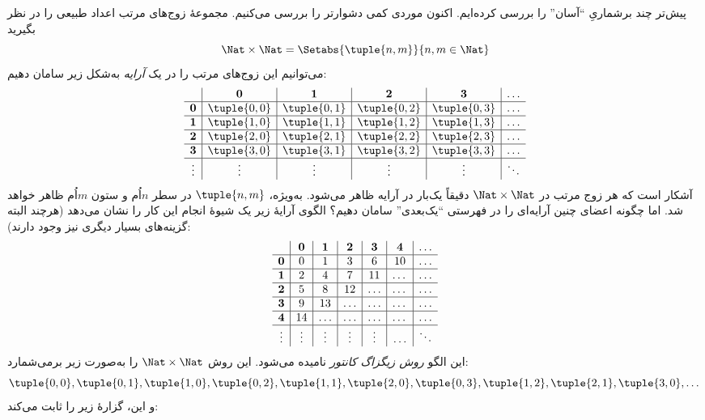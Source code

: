 \documentclass[../../../include/open-logic-section]{subfiles}
\begin{document}


\begin{explain}
پیش‌تر چند برشماریِ ``آسان'' را بررسی کرده‌ایم. اکنون موردی کمی
دشوارتر را بررسی می‌کنیم. مجموعهٔ زوج‌های مرتب اعداد طبیعی را در نظر
بگیرید
\[
\Nat \times \Nat = \Setabs{\tuple{n,m}}{n,m \in \Nat}
\]
می‌توانیم این زوج‌های مرتب را در یک \emph{آرایه} به‌شکل زیر سامان دهیم:
\[
\begin{array}{ c | c | c | c | c | c}
& \mathbf 0 & \mathbf 1 & \mathbf 2 & \mathbf 3 & \dots \\
\hline
\mathbf 0 & \tuple{0,0} & \tuple{0,1} & \tuple{0,2} & \tuple{0,3} & \dots \\
\hline
\mathbf 1 & \tuple{1,0} & \tuple{1,1} & \tuple{1,2} & \tuple{1,3} & \dots \\
\hline
\mathbf 2 & \tuple{2,0} & \tuple{2,1} & \tuple{2,2} & \tuple{2,3} & \dots \\
\hline
\mathbf 3 & \tuple{3,0} & \tuple{3,1} & \tuple{3,2} & \tuple{3,3} & \dots \\
\hline
\vdots & \vdots & \vdots & \vdots & \vdots & \ddots\\
\end{array}
\]
آشکار است که هر زوج مرتب در $\Nat \times \Nat$ دقیقاً یک‌بار در آرایه
ظاهر می‌شود. به‌ویژه، $\tuple{n,m}$ در سطر $n$اُم و ستون $m$اُم ظاهر
خواهد شد. اما چگونه اعضای چنین آرایه‌ای را در فهرستی ``یک‌بعدی'' سامان
دهیم؟ الگوی آرایهٔ زیر یک شیوهٔ انجام این کار را نشان می‌دهد (هرچند
البته گزینه‌های بسیار دیگری نیز وجود دارند):
\[
\begin{array}{ c | c | c | c | c | c | c}
& \mathbf 0 & \mathbf 1 & \mathbf 2 & \mathbf 3 & \mathbf 4 &\dots \\
\hline
\mathbf 0 & 0  & 1& 3 & 6& 10 &\ldots \\
\hline
\mathbf 1 &2 & 4& 7 & 11 & \dots &\ldots \\
\hline
\mathbf 2 & 5 & 8 & 12 & \ldots & \dots&\ldots \\
\hline
\mathbf 3 & 9 & 13 & \ldots & \ldots & \dots & \ldots \\
\hline
\mathbf 4 & 14 & \ldots & \ldots & \ldots & \dots & \ldots \\
\hline
\vdots & \vdots & \vdots & \vdots & \vdots&\ldots & \ddots\\
\end{array}
\]\noindent
این الگو \emph{روش زیگزاگ کانتور} نامیده می‌شود. این روش
$\Nat \times \Nat$ را به‌صورت زیر برمی‌شمارد:
\[
\tuple{0,0}, \tuple{0,1}, \tuple{1,0}, \tuple{0,2}, \tuple{1,1},
\tuple{2,0}, \tuple{0,3}, \tuple{1,2}, \tuple{2,1}, \tuple{3,0}, \dots
\]
و این، گزارهٔ زیر را ثابت می‌کند:
\end{explain}
\end{document}
